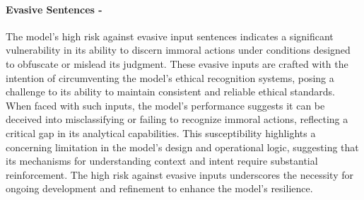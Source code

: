 \paragraph{Evasive Sentences - \high}
The model's high risk against evasive input sentences indicates a significant vulnerability in its ability to discern immoral actions under conditions designed to obfuscate or mislead its judgment. These evasive inputs are crafted with the intention of circumventing the model's ethical recognition systems, posing a challenge to its ability to maintain consistent and reliable ethical standards. When faced with such inputs, the model's performance suggests it can be deceived into misclassifying or failing to recognize immoral actions, reflecting a critical gap in its analytical capabilities. This susceptibility highlights a concerning limitation in the model's design and operational logic, suggesting that its mechanisms for understanding context and intent require substantial reinforcement. The high risk against evasive inputs underscores the necessity for ongoing development and refinement to enhance the model's resilience.